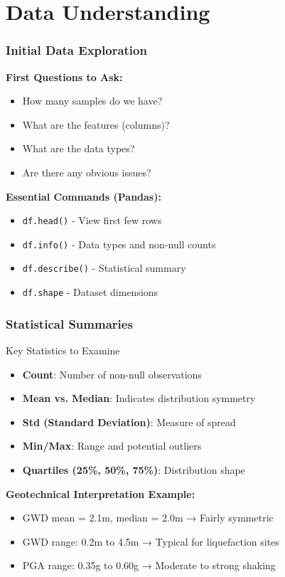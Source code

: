 \documentclass[aspectratio=169]{beamer}
\begin{document}
\section{Data Understanding}

\begin{frame}
\frametitle{Initial Data Exploration}

\textbf{First Questions to Ask:}
\begin{itemize}
    \item How many samples do we have?
    \item What are the features (columns)?
    \item What are the data types?
    \item Are there any obvious issues?
\end{itemize}

\vspace{0.5cm}

\textbf{Essential Commands (Pandas):}
\begin{itemize}
    \item \texttt{df.head()} - View first few rows
    \item \texttt{df.info()} - Data types and non-null counts
    \item \texttt{df.describe()} - Statistical summary
    \item \texttt{df.shape} - Dataset dimensions
\end{itemize}

\end{frame}

\begin{frame}[fragile]
\frametitle{Statistical Summaries}

\begin{block}{Key Statistics to Examine}
\begin{itemize}
    \item \textbf{Count}: Number of non-null observations
    \item \textbf{Mean vs. Median}: Indicates distribution symmetry
    \item \textbf{Std (Standard Deviation)}: Measure of spread
    \item \textbf{Min/Max}: Range and potential outliers
    \item \textbf{Quartiles (25\%, 50\%, 75\%)}: Distribution shape
\end{itemize}
\end{block}

\vspace{0.3cm}

\textbf{Geotechnical Interpretation Example:}
\begin{itemize}
    \item GWD mean = 2.1m, median = 2.0m → Fairly symmetric
    \item GWD range: 0.2m to 4.5m → Typical for liquefaction sites
    \item PGA range: 0.35g to 0.60g → Moderate to strong shaking
\end{itemize}

\end{frame}
\end{document}
